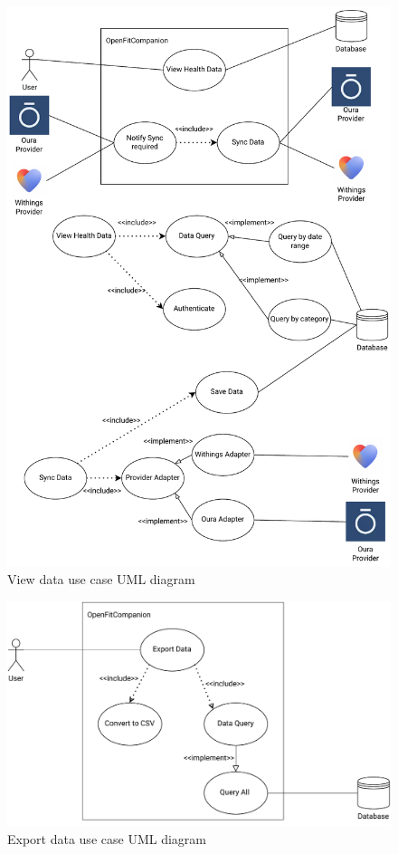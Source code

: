 \begin{figure}
    \centering
    \includegraphics[width=\textwidth,height=\textheight,keepaspectratio]{../images/viewFunc.pdf}
    \caption{View data use case UML diagram}
    \label{fig:2}
\end{figure}
\begin{figure}
    \centering
    \includegraphics[width=\textwidth,height=\textheight,keepaspectratio]{../images/exportDataFunc.pdf}
    \caption{Export data use case UML diagram}
    \label{fig:3}
\end{figure}
